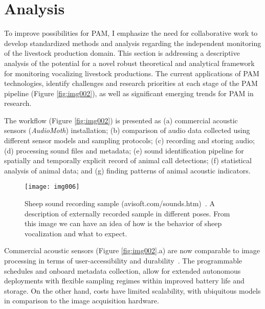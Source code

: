 \section{Analysis}
\label{sec:sec002}

To improve possibilities for PAM, I emphasize the need for collaborative work to develop standardized methods and analysis regarding the independent monitoring of the livestock production domain.
This section is addressing a descriptive analysis of the potential for a novel robust theoretical and analytical framework for monitoring vocalizing livestock productions.
The current applications of PAM technologies, identify challenges and research priorities at each stage of the PAM pipeline (Figure \ref{fig:img002}), as well as significant emerging trends for PAM in research.

The workflow (Figure \ref{fig:img002}) is presented as (a) commercial acoustic sensors (\textit{AudioMoth}) installation; (b) comparison of audio data collected using different sensor models and sampling protocols; (c) recording and storing audio; (d) processing sound files and metadata; (e) sound identification pipeline for spatially and temporally explicit record of animal call detections; (f) statistical analysis of animal data; and (g) finding patterns of animal acoustic indicators.


\hfill

\begin{figure}[!ht]
\texttt{[image: img006]}
\caption{Sheep sound recording sample (avisoft.com/sounds.htm)~\cite{astuti2011animal}. A description of externally recorded sample in different poses. From this image we can have an idea of how is the behavior of sheep vocalization and what to expect.}
\label{fig:img006}
\end{figure}

\hfill


Commercial acoustic sensors (Figure \ref{fig:img002}.a) are now comparable to image processing in terms of user-accessibility and durability~\cite{gibb2018emerging}.
The programmable schedules and onboard metadata collection, allow for extended autonomous deployments with flexible sampling regimes within improved battery life and storage.
On the other hand, costs have limited scalability, with ubiquitous models in comparison to the image acquisition hardware.

